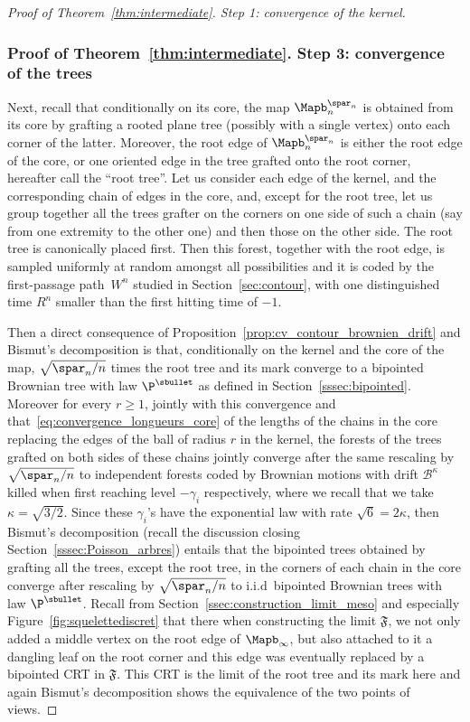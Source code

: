 \begin{proof}[Proof of Theorem~\ref{thm:intermediate}. Step 1: convergence of the kernel]
\subsubsection*{Proof of Theorem~\ref{thm:intermediate}. Step 3: convergence of the trees}
Next, recall that conditionally on its core, the map $\Mapb_n^{\spar_n}$ is obtained from its core by grafting a rooted plane tree (possibly with a single vertex) onto each corner of the latter. Moreover, the root edge of $\Mapb_n^{\spar_n}$ is either the root edge of the core, or one oriented edge in the tree grafted onto the root corner, hereafter call the ``root tree''.
Let us consider each edge of the kernel, and the corresponding chain of edges in the core, and, except for the root tree, let us group together all the trees grafter on the corners on one side of such a chain (say from one extremity to the other one) and then those on the other side. The root tree is canonically placed first.
Then this forest, together with the root edge, is sampled uniformly at random amongst all possibilities and it is coded by the first-passage path~$W^n$ studied in Section~\ref{sec:contour}, with one distinguished time $R^n$ smaller than the first hitting time of $-1$.

Then a direct consequence of Proposition~\ref{prop:cv_contour_brownien_drift} and Bismut's decomposition is that, conditionally on the kernel and the core of the map, $\sqrt{\spar_n/n}$ times the root tree and its mark converge to a bipointed Brownian tree with law $ \P^{\sbullet}$ as defined in Section~\ref{sssec:bipointed}. Moreover for every $r \ge 1$, jointly with this convergence and that~\eqref{eq:convergence_longueurs_core} of the lengths of the chains in the core replacing the edges of the ball of radius $r$ in the kernel, the forests of the trees grafted on both sides of these chains jointly converge after the same rescaling by $\sqrt{\spar_n/n}$ to independent forests coded by Brownian motions with drift $\mathcal{B}^\kappa$ killed when first reaching level $-\gamma_i$ respectively, where we recall that we take $\kappa = \sqrt{3/2}$. Since these $\gamma_i$'s have the exponential law with rate $\sqrt{6} = 2\kappa$, then Bismut's decomposition (recall the discussion closing Section~\ref{sssec:Poisson_arbres}) entails that the bipointed trees obtained by grafting all the trees, except the root tree, in the corners of each chain in the core converge after rescaling by $\sqrt{\spar_n/n}$ to i.i.d~bipointed Brownian trees with law $ \P^{\sbullet}$.
Recall from Section~\ref{ssec:construction_limit_meso} and especially Figure~\ref{fig:squelettediscret} that there when constructing the limit $\mathfrak{F}$, we not only added a middle vertex on the root edge of $\Mapb_\infty$, but also attached to it a dangling leaf on the root corner and this edge was eventually replaced by a bipointed CRT in $\mathfrak{F}$. This CRT is the limit of the root tree and its mark here and again Bismut's decomposition shows the equivalence of the two points of views.


\end{proof}
